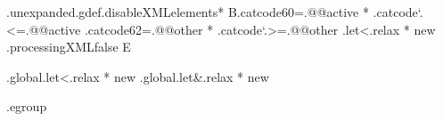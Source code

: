 .unexpanded.gdef.disableXMLelements*
  B.catcode60=.@@active * .catcode`.<=.@@active
   .catcode62=.@@other  * .catcode`.>=.@@other
   .let<.relax * new
   .processingXMLfalse
  E

.global.let<.relax * new
.global.let&.relax * new

.egroup

\def\disableXML{\setnormalcatcodes\processingXMLfalse}





